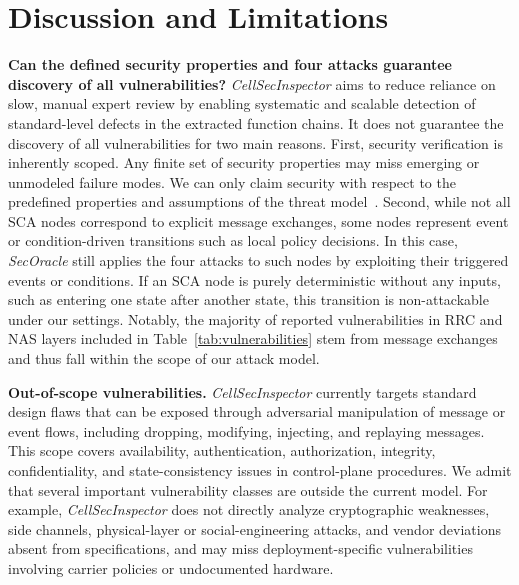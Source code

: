 \documentclass[sigconf]{acmart}
\newcommand{\lm}{\textit{CellSecInspector}\xspace}
\begin{document}
{ 









\vspace{-0.08in}
\section{Discussion and Limitations}
\label{append:discussion}

\noindent \textbf{Can the defined security properties and four attacks guarantee discovery of all vulnerabilities?} 
\lm aims to reduce reliance on slow, manual expert review by enabling systematic and scalable detection of standard-level defects in the extracted function chains. It does not guarantee the discovery of all vulnerabilities for two main reasons.
First, security verification is inherently scoped. Any finite set of security properties may miss emerging or unmodeled failure modes. We can only claim security with respect to the predefined properties and assumptions of the threat model~\cite{chen2023sherlock,al2024hermes}. Second, while not all SCA nodes correspond to explicit message exchanges, some nodes represent event or condition-driven transitions such as local policy decisions. In this case, \textit{SecOracle} still applies the four attacks to such nodes by exploiting their triggered events or conditions. If an SCA node is purely deterministic without any inputs, such as entering one state after another state, this transition is non-attackable under our settings. Notably, the majority of reported vulnerabilities in RRC and NAS layers included in Table~\ref{tab:vulnerabilities} stem from message exchanges and thus fall within the scope of our attack model.   

\noindent  \textbf{Out-of-scope vulnerabilities.}
\lm currently targets standard design flaws that can be exposed through adversarial manipulation of message or event flows, including dropping, modifying, injecting, and replaying messages. This scope covers availability, authentication, authorization, integrity, confidentiality, and state-consistency issues in control-plane procedures. We admit that several important vulnerability classes are outside the current model. For example, \lm does not directly analyze cryptographic weaknesses, side channels, physical-layer or social-engineering attacks, and vendor deviations absent from specifications, and may miss deployment-specific vulnerabilities involving carrier policies or undocumented hardware.





}
\end{document}

